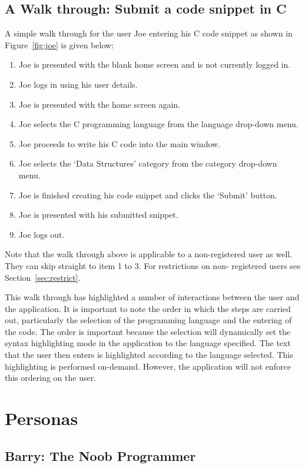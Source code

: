 \documentclass{sig-alt-release2}
\begin{document}
\subsection{A Walk through: Submit a code snippet in C}

A simple walk through for the user Joe entering his C code snippet as
shown in Figure~\ref{fig:joe} is given below:

\begin{enumerate}
\item Joe is presented with the blank home screen and is not currently logged
in.
\item Joe logs in using his user details.
\item Joe is presented with the home screen again.
\item Joe selects the C programming language from the language drop-down
menu.
\item Joe proceeds to write his C code into the main window.
\item Joe selects the `Data Structures' category from the category
drop-down menu.
\item Joe is finished creating his code snippet and clicks the `Submit'
button.
\item Joe is presented with his submitted snippet.
\item Joe logs out.
\end{enumerate}

Note that the walk through above is applicable to a non-registered user
as well. They can skip straight to item 1 to 3. For restrictions on non-
registered users see Section~\ref{sec:restrict}.

This walk through has highlighted a number of interactions between the
user and the application. It is important to note the order in which
the steps are carried out, particularly the selection of the
programming language and the entering of the code. The order is
important because the selection will dynamically set the syntax
highlighting mode in the application to the language specified.
The text that the user then enters is highlighted according to the
language selected. This highlighting is performed on-demand. %
However, the application will not enforce this ordering on the user.

\section{Personas}

\subsection{Barry: The Noob Programmer}
\label{sec:barry} 
\end{document}
